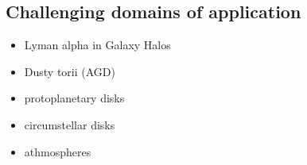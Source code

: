 \documentclass[../main/main.tex]{subfiles}
\begin{document}
\subsection{Challenging domains of application}
\begin{itemize}
\item Lyman alpha in Galaxy Halos
\item Dusty torii (AGD)
\item protoplanetary disks
\item circumstellar disks
\item athmospheres
\end{itemize}

\newpage
\end{document}

